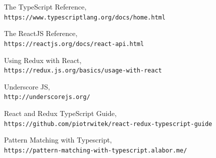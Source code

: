 \documentclass[rel_mlp]{iiufrgs}
\begin{document}
\begin{thebibliography}{9}
The TypeScript Reference,
\\\texttt{https://www.typescriptlang.org/docs/home.html}

The ReactJS Reference,
\\\texttt{https://reactjs.org/docs/react-api.html}


Using Redux with React,
\\\texttt{https://redux.js.org/basics/usage-with-react}

Underscore JS,
\\\texttt{http://underscorejs.org/}

React and Redux TypeScript Guide,
\\\texttt{https://github.com/piotrwitek/react-redux-typescript-guide}

Pattern Matching with Typescript,
\\\texttt{https://pattern-matching-with-typescript.alabor.me/}



\end{thebibliography}
\end{document}
